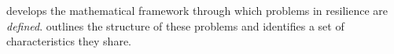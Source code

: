  develops the mathematical framework through which problems in resilience are \emph{defined}. 
outlines the structure of these problems and identifies a set of
characteristics they share. 
